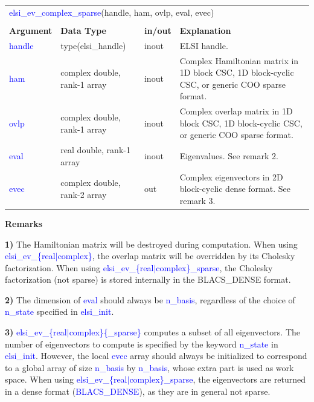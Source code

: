 \documentclass{report}
\newcommand{\tcb}[1]{\textcolor{blue}{#1}}
\begin{document}
\begin{tabular}[]{|p{20mm}|p{45mm}|p{15mm}|p{85mm}|}
\multicolumn{4}{l}{\tcb{elsi\_ev\_complex\_sparse}(handle, ham, ovlp, eval, evec)}\\
\multicolumn{4}{l}{}\\
\hline
\multicolumn{1}{|l|}{\textbf{Argument}} & \multicolumn{1}{l|}{\textbf{Data Type}} & \multicolumn{1}{l|}{\textbf{in/out}} & \multicolumn{1}{l|}{\textbf{Explanation}}\\
\hline
\tcb{handle} & type(elsi\_handle)           & inout & ELSI handle.\\
\hline
\tcb{ham}    & complex double, rank-1 array & inout & Complex Hamiltonian matrix in 1D block CSC, 1D block-cyclic CSC, or generic COO sparse format.\\
\hline
\tcb{ovlp}   & complex double, rank-1 array & inout & Complex overlap matrix in 1D block CSC, 1D block-cyclic CSC, or generic COO sparse format.\\
\hline
\tcb{eval}   & real double, rank-1 array    & inout & Eigenvalues. See remark 2.\\
\hline
\tcb{evec}   & complex double, rank-2 array & out   & Complex eigenvectors in 2D block-cyclic dense format. See remark 3.\\
\hline
\end{tabular}

\textbf{Remarks}

\textbf{1)} The Hamiltonian matrix will be destroyed during computation. When using \tcb{elsi\_ev\_\{real$\vert$complex\}}, the overlap matrix will be overridden by its Cholesky factorization. When using \tcb{elsi\_ev\_\{real$\vert$complex\}\_sparse}, the Cholesky factorization (not sparse) is stored internally in the BLACS\_DENSE format.

\textbf{2)} The dimension of \tcb{eval} should always be \tcb{n\_basis}, regardless of the choice of \tcb{n\_state} specified in \tcb{elsi\_init}.

\textbf{3)} \tcb{elsi\_ev\_\{real$\vert$complex\}\{\_sparse\}} computes a subset of all eigenvectors. The number of eigenvectors to compute is specified by the keyword \tcb{n\_state} in \tcb{elsi\_init}. However, the local \tcb{evec} array should always be initialized to correspond to a global array of size \tcb{n\_basis} by \tcb{n\_basis}, whose extra part is used as work space. When using \tcb{elsi\_ev\_\{real$\vert$complex\}\_sparse}, the eigenvectors are returned in a dense format (\tcb{BLACS\_DENSE}), as they are in general not sparse.
\end{document}

